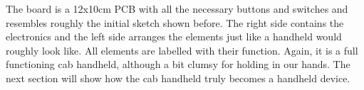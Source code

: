 
The board is a 12x10cm PCB with all the necessary buttons and switches and resembles roughly the initial sketch shown before. The right side contains the electronics and the left side arranges the elements just like a handheld would roughly look like. All elements are labelled with their function. Again, it is a full functioning cab handheld, although a bit clumsy for holding in our hands. The next section will show how the cab handheld truly becomes a handheld device.
